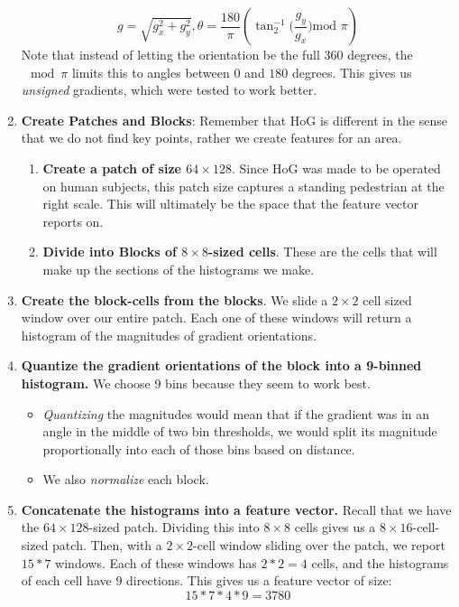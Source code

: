 \documentclass{article}
\begin{document}
\begin{enumerate}
    $$g = \sqrt{g_x^2 + g_y^2}, \theta = \frac{180}{\pi}(\tan_2^{-1}\bigg(\frac{g_y}{g_x}\bigg)\text{mod }\pi)$$
    Note that instead of letting the orientation be the full $360$ degrees, the $\mod{\pi}$ limits this to angles between $0$ and $180$ degrees. This gives us \textit{unsigned} gradients, which were tested to work better.
    \item \textbf{Create Patches and Blocks}: Remember that HoG is different in the sense that we do not find key points, rather we create features for an area. \begin{enumerate}
        \item \textbf{Create a patch of size $64 \times 128$}. Since HoG was made to be operated on human subjects, this patch size captures a standing pedestrian at the right scale. This will ultimately be the space that the feature vector reports on.
        \item \textbf{Divide into Blocks of $8 \times 8$-sized cells}. These are the cells that will make up the sections of the histograms we make. 
    \end{enumerate}
    \item \textbf{Create the block-cells from the blocks}. We slide a $2 \times 2$ cell sized window over our entire patch. Each one of these windows will return  a histogram of the magnitudes of gradient orientations.
    \item \textbf{Quantize the gradient orientations of the block into a 9-binned histogram.} We choose 9 bins because they seem to work best.
    \begin{itemize}
        \item \textit{Quantizing} the magnitudes would mean that if the gradient was in an angle in the middle of two bin thresholds, we would split its magnitude proportionally into each of those bins based on distance. 
        \item We also \textit{normalize} each block. 
    \end{itemize}
    \item \textbf{Concatenate the histograms into a feature vector.} Recall that we have the $64 \times 128$-sized patch. Dividing this into $8\times 8$ cells gives us a $8\times 16$-cell-sized patch. Then, with a $2\times2$-cell window sliding over the patch, we report $15 * 7$ windows. Each of these windows has $2*2 = 4$ cells, and the histograms of each cell have $9$ directions. This gives us a feature vector of size:
    $$15 * 7 * 4 * 9 = 3780$$
\end{enumerate}
\end{document}
